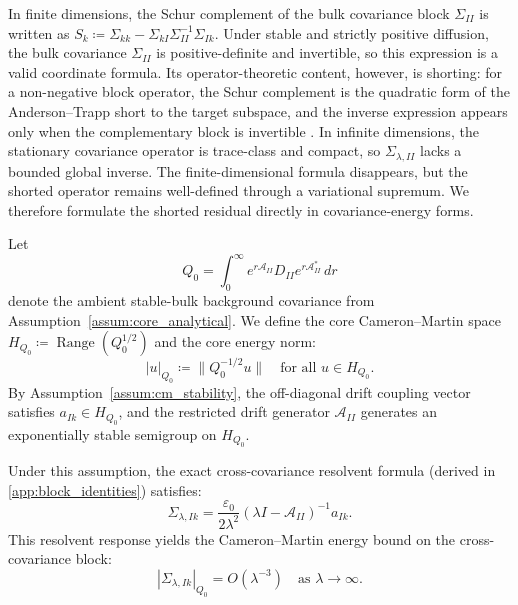 \documentclass[preprint,12pt]{elsarticle}
\theoremstyle{plain}
\theoremstyle{definition}
\theoremstyle{remark}
\begin{document}
    In finite dimensions, the Schur complement of the bulk covariance block
    $\Sigma_{II}$ is written as
    $S_k \coloneqq \Sigma_{kk} - \Sigma_{kI}\Sigma_{II}^{-1}\Sigma_{Ik}$.
    Under stable and strictly positive diffusion, the bulk covariance
    $\Sigma_{II}$ is positive-definite and invertible, so this expression is a
    valid coordinate formula.  Its operator-theoretic content, however, is
    shorting: for a non-negative block operator, the Schur complement is the
    quadratic form of the Anderson--Trapp short to the target subspace, and the
    inverse expression appears only when the complementary block is invertible
    \cite{krein1947selfadjoint,anderson1975shorted}.  In infinite dimensions,
    the stationary covariance operator is trace-class and compact, so
    $\Sigma_{\lambda,II}$ lacks a bounded global inverse.  The finite-dimensional
    formula disappears, but the shorted operator remains well-defined through a
    variational supremum.  We therefore formulate the shorted residual directly
    in covariance-energy forms.

    Let
    \[
    Q_0
    =
    \int_0^\infty e^{r\mathcal A_{II}}D_{II}e^{r\mathcal A_{II}^*}\,dr
    \]
    denote the ambient stable-bulk background covariance from Assumption~\ref{assum:core_analytical}. We define the core Cameron--Martin space $H_{Q_0} \coloneqq \operatorname{Range}(Q_0^{1/2})$ and the core energy norm:
    \begin{equation}
        |u|_{Q_0} \coloneqq \|Q_0^{-1/2} u\| \quad \text{for all } u \in H_{Q_0}.
    \end{equation}
    By Assumption~\ref{assum:cm_stability}, the off-diagonal drift coupling vector satisfies $a_{Ik} \in H_{Q_0}$, and the restricted drift generator $\mathcal{A}_{II}$ generates an exponentially stable semigroup on $H_{Q_0}$.

    Under this assumption, the exact cross-covariance resolvent formula (derived in \ref{app:block_identities}) satisfies:
    \begin{equation}
        \Sigma_{\lambda,Ik} = \frac{\varepsilon_0}{2\lambda^2} (\lambda I - \mathcal{A}_{II})^{-1} a_{Ik}.
    \end{equation}
    This resolvent response yields the Cameron--Martin energy bound on the cross-covariance block:
    \begin{equation}
        \label{eq:cross_norm_bound}
        |\Sigma_{\lambda,Ik}|_{Q_0} = O(\lambda^{-3}) \quad \text{as } \lambda \to \infty.
    \end{equation}
\end{document}
